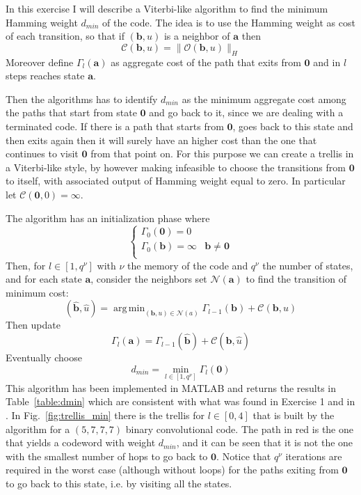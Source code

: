 \documentclass[10pt]{article}
\DeclareMathOperator*{\argmin}{arg\,min}
\newcommand{\outf}[1] {\mathcal{O}(#1)}
\begin{document}
In this exercise I will describe a Viterbi-like algorithm to find the minimum Hamming weight $d_{min}$ of the code. The idea is to use the Hamming weight as cost of each transition, so that if $(\mathbf{b}, u)$ is a neighbor of $\mathbf{a}$ then
\begin{equation}
	\mathcal{C}(\mathbf{b}, u) = \|\outf{\mathbf{b}, u}\|_H
\end{equation}
Moreover define $\Gamma_l(\mathbf{a})$ as aggregate cost of the path that exits from $\mathbf{0}$ and in $l$ steps reaches state $\mathbf{a}$.

Then the algorithms has to identify $d_{min}$ as the minimum aggregate cost among the paths that start from state $\mathbf{0}$ and go back to it, since we are dealing with a terminated code. If there is a path that starts from $\mathbf{0}$, goes back to this state and then exits again then it will surely have an higher cost than the one that continues to visit $\mathbf{0}$ from that point on. For this purpose we can create a trellis in a Viterbi-like style, by however making infeasible to choose the transitions from $\mathbf{0}$ to itself, with associated output of Hamming weight equal to zero. In particular let $\mathcal{C}(\mathbf{0}, 0) = \infty$.

The algorithm has an initialization phase where 
\begin{equation}
\begin{cases}
	\Gamma_0(\mathbf{0}) = 0 \\
	\Gamma_0(\mathbf{b}) = \infty & \mathbf{b} \ne \mathbf{0} \\

\end{cases}
\end{equation}	
Then, for $l \in [1, q^{\nu}]$ with $\nu$ the memory of the code and $q^{\nu}$ the number of states, and for each state $\mathbf{a}$, consider the neighbors set $\mathcal{N}(\mathbf{a})$ to find the transition of minimum cost:
\begin{equation}
	(\mathbf{\hat{b}}, \hat{u}) = \argmin_{(\mathbf{b}, u) \in \mathcal{N}(a)} \Gamma_{l-1}(\mathbf{b}) + \mathcal{C}(\mathbf{b}, u)
\end{equation}
Then update 
\begin{equation}
	\Gamma_{l}(\mathbf{a}) = \Gamma_{l-1}(\mathbf{\hat{b}}) + \mathcal{C}(\mathbf{\hat{b}}, \hat{u})
\end{equation}
Eventually choose 
\begin{equation}
	d_{min} = \min_{l \in [1, q^{\nu}]} \Gamma_l(\mathbf{0})
\end{equation}
This algorithm has been implemented in MATLAB and returns the results in Table~\ref{table:dmin} which are consistent with what was found in Exercise 1 and in \cite{proakis}. In Fig.~\ref{fig:trellis_min} there is the trellis for $l\in[0,4]$ that is built by the algorithm for a $(5,7,7,7)$ binary convolutional code. The path in red is the one that yields a codeword with weight $d_{min}$, and it can be seen that it is not the one with the smallest number of hops to go back to $\mathbf{0}$. Notice that $q^{\nu}$ iterations are required in the worst case (although without loops) for the paths exiting from $\mathbf{0}$ to go back to this state, i.e. by visiting all the states.
\end{document}
